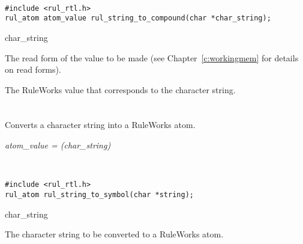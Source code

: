 \begin{args}
   \\
\end{args}

\CBinding
\begin{verbatim}
#include <rul_rtl.h>
rul_atom atom_value rul_string_to_compound(char *char_string);
\end{verbatim}

\begin{argument}
\item[char\_string]

  The read form of the  value to be made (see
  Chapter~\ref{c:workingmem} for details on read forms).
\end{argument}

\ReturnValue

The RuleWorks  value that corresponds to the character string.

\begin{seealso}

\end{seealso}

\section*{}

Converts a character string into a RuleWorks  atom.

\Syntax

\it{atom\_value} = (\it{char\_string})

\begin{args}
   \\
\end{args}

\CBinding
\begin{verbatim}
#include <rul_rtl.h>
rul_atom rul_string_to_symbol(char *string);
\end{verbatim}

\begin{argument}
\item[char\_string]

The character string to be converted to a RuleWorks atom.
\end{argument}


